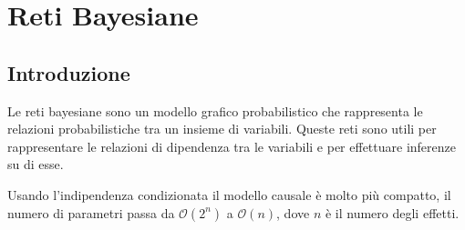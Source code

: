 \chapter{Reti Bayesiane} \label{cap:RetiBayesiane}
\section{Introduzione}
Le reti bayesiane sono un modello grafico probabilistico che rappresenta le relazioni
probabilistiche tra un insieme di variabili. Queste reti sono utili per rappresentare
le relazioni di dipendenza tra le variabili e per effettuare inferenze su di esse.

Usando l'indipendenza condizionata il modello causale è molto più compatto, il
numero di parametri passa da $\mathcal{O}(2^n)$ a $\mathcal{O}(n)$, dove $n$ 
è il numero degli effetti.